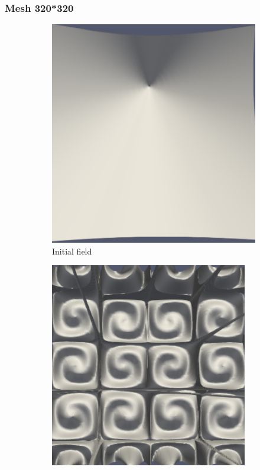 \documentclass{article}
\begin{document}
\subsubsection{Mesh 320*320}
\begin{figure}[hbt!]
  \begin{subfigure}{0.4\textwidth}
        \centering
        \includegraphics[width=\textwidth]{Figures/e-5 320x320/for n 1.png}
        \caption{Initial field}
  \end{subfigure}
  \hfill
  \begin{subfigure}{0.4\textwidth}
        \centering
        \includegraphics[width=\textwidth]{Figures/e-5 320x320/for n 100.png}

\end{subfigure}
\end{figure}
\end{document}
